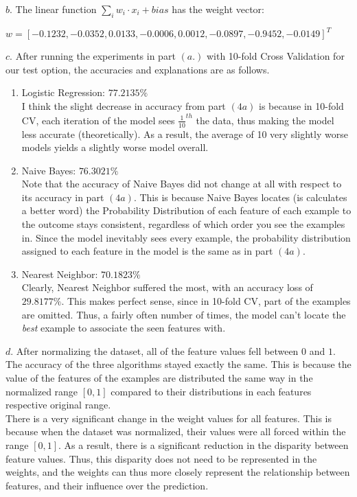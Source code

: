 \documentclass[11pt]{article}
\begin{document}
\noindent $b.$ The linear function $\sum_{i} w_i \cdot x_i + bias$ has the weight vector:
\begin{center}$w = [-0.1232, -0.0352, 0.0133, -0.0006, 0.0012, -0.0897, -0.9452, -0.0149]^T$\end{center}


\noindent $c.$ After running the experiments in part $(a.)$ with 10-fold Cross Validation for our test option, the accuracies and explanations are as follows.
\begin{enumerate}
\item Logistic Regression: $77.2135\%$\\
I think the slight decrease in accuracy from part $(4a)$ is because in 10-fold CV, each iteration of the model sees $\frac{1}{10}^{th}$ the data, thus making the model less accurate (theoretically). As a result, the average of 10 very slightly worse models yields a slightly worse model overall. 
\item Naive Bayes: $76.3021\%$\\
Note that the accuracy of Naive Bayes did not change at all with respect to its accuracy in part $(4a)$. This is because Naive Bayes locates (is calculates a better word) the Probability Distribution of each feature of each example to the outcome stays consistent, regardless of which order you see the examples in. Since the model inevitably sees every example, the probability distribution assigned to each feature in the model is the same as in part $(4a)$.
\item Nearest Neighbor: $70.1823\%$\\
Clearly, Nearest Neighbor suffered the most, with an accuracy loss of $29.8177\%$. This makes perfect sense, since in 10-fold CV, part of the examples are omitted. Thus, a fairly often number of times, the model can't locate the \textit{best} example to associate the seen features with. 
\end{enumerate}

\noindent $d.$ After normalizing the dataset, all of the feature values fell between $0$ and $1$.\\

The accuracy of the three algorithms stayed exactly the same. This is because the value of the features of the examples are distributed the same way in the normalized range $[0, 1]$ compared to their distributions in each features respective original range.\\

There is a very significant change in the weight values for all features. This is because when the dataset was normalized, their values were all forced within the range $[0, 1]$. As a result, there is a significant reduction in the disparity between feature values. Thus, this disparity does not need to be represented in the weights, and the weights can thus more closely represent the relationship between features, and their influence over the prediction.\\
\pagebreak
\end{document}

